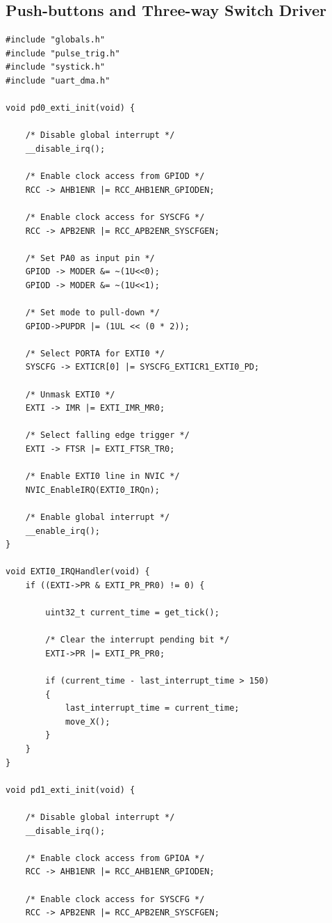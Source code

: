 \documentclass[12pt]{article}
\numberwithin{subsubsubsection}{subsubsection}
\begin{document}
\subsection{Push-buttons and Three-way Switch Driver}

\begin{verbatim}
#include "globals.h"
#include "pulse_trig.h"
#include "systick.h"
#include "uart_dma.h"

void pd0_exti_init(void) {

    /* Disable global interrupt */
    __disable_irq();
    
    /* Enable clock access from GPIOD */
    RCC -> AHB1ENR |= RCC_AHB1ENR_GPIODEN;
    
    /* Enable clock access for SYSCFG */
    RCC -> APB2ENR |= RCC_APB2ENR_SYSCFGEN;
    
    /* Set PA0 as input pin */
    GPIOD -> MODER &= ~(1U<<0);
    GPIOD -> MODER &= ~(1U<<1);
    
    /* Set mode to pull-down */
    GPIOD->PUPDR |= (1UL << (0 * 2));
    
    /* Select PORTA for EXTI0 */
    SYSCFG -> EXTICR[0] |= SYSCFG_EXTICR1_EXTI0_PD;
    
    /* Unmask EXTI0 */
    EXTI -> IMR |= EXTI_IMR_MR0;
    
    /* Select falling edge trigger */
    EXTI -> FTSR |= EXTI_FTSR_TR0;
    
    /* Enable EXTI0 line in NVIC */
    NVIC_EnableIRQ(EXTI0_IRQn);
    
    /* Enable global interrupt */
    __enable_irq();
}

void EXTI0_IRQHandler(void) {
    if ((EXTI->PR & EXTI_PR_PR0) != 0) {

        uint32_t current_time = get_tick();

        /* Clear the interrupt pending bit */
        EXTI->PR |= EXTI_PR_PR0;  

        if (current_time - last_interrupt_time > 150)
        {
        	last_interrupt_time = current_time;
        	move_X();
        }
    }
}

void pd1_exti_init(void) {

    /* Disable global interrupt */
    __disable_irq();
    
    /* Enable clock access from GPIOA */
    RCC -> AHB1ENR |= RCC_AHB1ENR_GPIODEN;
    
    /* Enable clock access for SYSCFG */
    RCC -> APB2ENR |= RCC_APB2ENR_SYSCFGEN;
    

\end{verbatim}
\end{document}

